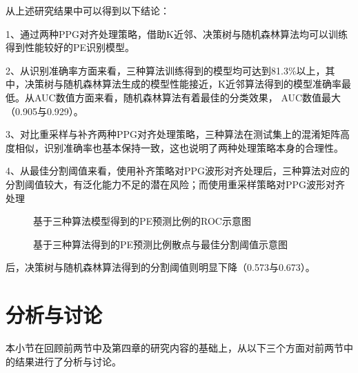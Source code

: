 从上述研究结果中可以得到以下结论：

1、通过两种PPG对齐处理策略，借助K近邻、决策树与随机森林算法均可以训练得到性能较好的PE识别模型。

2、从识别准确率方面来看，三种算法训练得到的模型均可达到81.3\%以上，其中，决策树与随机森林算法生成的模型性能接近，K近邻算法得到的模型准确率最低。从AUC数值方面来看，随机森林算法有着最佳的分类效果，
AUC数值最大（0.905与0.929）。

3、对比重采样与补齐两种PPG对齐处理策略，三种算法在测试集上的混淆矩阵高度相似，识别准确率也基本保持一致，这也说明了两种处理策略本身的合理性。

4、从最佳分割阈值来看，使用补齐策略对PPG波形对齐处理后，三种算法对应的分割阈值较大，有泛化能力不足的潜在风险；而使用重采样策略对PPG波形对齐处理

\begin{figure}[htbp]
    \centering
    \quad
    \caption{\label{fig:model_roc2}基于三种算法模型得到的PE预测比例的ROC示意图}
\end{figure}

\begin{figure}[htbp]
    \centering
    \quad
    \quad
    \quad
    \caption{\label{fig:pr_model2}基于三种算法得到的PE预测比例散点与最佳分割阈值示意图}
\end{figure}

\noindent
后，决策树与随机森林算法得到的分割阈值则明显下降（0.573与0.673）。

\section{分析与讨论}
本小节在回顾前两节中及第四章的研究内容的基础上，从以下三个方面对前两节中的结果进行了分析与讨论。

